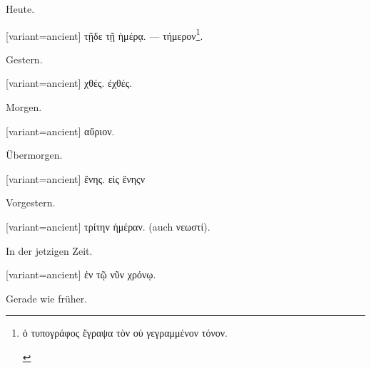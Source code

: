 Heute.

\switchcolumn

\begin{greek}[variant=ancient]%
τῇδε τῇ ἡμέρᾳ. --- τήμερον\footnote{\begin{latin}%
\textgreek[variant=ancient]{ὁ τυπογράφος ἔγραψα τὸν οὐ γεγραμμένον
τόνον.}\end{latin}%
}.

\end{greek}%
\switchcolumn*

Gestern.

\switchcolumn

\begin{greek}[variant=ancient]%
χθές. ἐχθές.

\end{greek}%
\switchcolumn*

Morgen.

\switchcolumn

\begin{greek}[variant=ancient]%
αὔριον.

\end{greek}%
\switchcolumn*

Übermorgen.

\switchcolumn

\begin{greek}[variant=ancient]%
ἕνης. εἰς ἕνηςν

\end{greek}%
\switchcolumn*

Vorgestern.

\switchcolumn

\begin{greek}[variant=ancient]%
τρίτην ἡμέραν. (\textgerman[spelling=old,babelshorthands=true]{auch}
νεωστί).

\end{greek}%
\indent In der jetzigen Zeit.

\switchcolumn

\begin{greek}[variant=ancient]%
ἐν τῷ νῦν χρόνῳ.

\end{greek}%
\switchcolumn*

Gerade wie früher.

